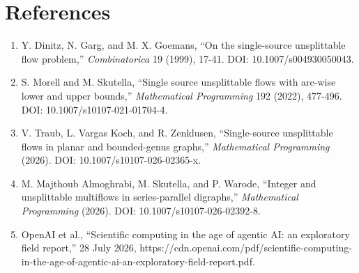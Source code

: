 \documentclass[
  11pt,
]{article}
\providecommand{\tightlist}{%
  \setlength{\itemsep}{0pt}\setlength{\parskip}{0pt}}
\begin{document}
\section{References}\label{references}

\begin{enumerate}
\def\labelenumi{\arabic{enumi}.}
\tightlist
\item
  Y. Dinitz, N. Garg, and M. X. Goemans, ``On the single-source
  unsplittable flow problem,'' \emph{Combinatorica} 19 (1999), 17-41.
  DOI: 10.1007/s004930050043.
\item
  S. Morell and M. Skutella, ``Single source unsplittable flows with
  arc-wise lower and upper bounds,'' \emph{Mathematical Programming} 192
  (2022), 477-496. DOI: 10.1007/s10107-021-01704-4.
\item
  V. Traub, L. Vargas Koch, and R. Zenklusen, ``Single-source
  unsplittable flows in planar and bounded-genus graphs,''
  \emph{Mathematical Programming} (2026). DOI:
  10.1007/s10107-026-02365-x.
\item
  M. Majthoub Almoghrabi, M. Skutella, and P. Warode, ``Integer and
  unsplittable multiflows in series-parallel digraphs,''
  \emph{Mathematical Programming} (2026). DOI:
  10.1007/s10107-026-02392-8.
\item
  OpenAI et al., ``Scientific computing in the age of agentic AI: an
  exploratory field report,'' 28 July 2026,
  https://cdn.openai.com/pdf/scientific-computing-in-the-age-of-agentic-ai-an-exploratory-field-report.pdf.
\end{enumerate}
\end{document}
